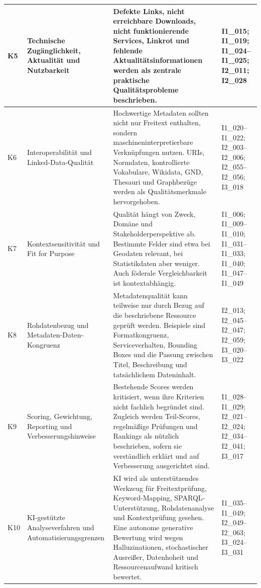 \begin{center}
\begin{longtable}{p{} p{} p{} p{}}
K5 & Technische Zugänglichkeit, Aktualität und Nutzbarkeit
& Defekte Links, nicht erreichbare Downloads, nicht funktionierende Services, Linkrot und fehlende Aktualitätsinformationen werden als zentrale praktische Qualitätsprobleme beschrieben.
& I1\_015; I1\_019; I1\_024--I1\_025; I2\_011; I2\_028 \\ \hline

K6 & Interoperabilität und Linked-Data-Qualität
& Hochwertige Metadaten sollten nicht nur Freitext enthalten, sondern maschineninterpretierbare Verknüpfungen nutzen. URIs, Normdaten, kontrollierte Vokabulare, Wikidata, \acrfull{GND}, Thesauri und Graphbezüge werden als Qualitätsmerkmale hervorgehoben.
& I1\_020--I1\_022; I2\_003--I2\_006; I2\_055--I2\_056; I3\_018 \\ \hline

K7 & Kontextsensitivität und Fit for Purpose
& Qualität hängt von Zweck, Domäne und Stakeholderperspektive ab. Bestimmte Felder sind etwa bei Geodaten relevant, bei Statistikdaten aber weniger. Auch föderale Vergleichbarkeit ist kontextabhängig.
& I1\_006; I1\_009--I1\_010; I1\_031--I1\_033; I1\_040; I1\_047--I1\_049 \\ \hline

K8 & Rohdatenbezug und Metadaten-Daten-Kongruenz
& Metadatenqualität kann teilweise nur durch Bezug auf die beschriebene Ressource geprüft werden. Beispiele sind Formatkongruenz, Serviceverhalten, Bounding Boxes und die Passung zwischen Titel, Beschreibung und tatsächlichem Dateninhalt.
& I2\_013; I2\_045--I2\_047; I2\_059; I3\_020--I3\_022 \\ \hline

K9 & Scoring, Gewichtung, Reporting und Verbesserungshinweise
& Bestehende Scores werden kritisiert, wenn ihre Kriterien nicht fachlich begründet sind. Zugleich werden Teil-Scores, regelmäßige Prüfungen und Rankings als nützlich beschrieben, sofern sie verständlich erklärt und auf Verbesserung ausgerichtet sind.
& I1\_028--I1\_029; I2\_021--I2\_024; I2\_034--I2\_041; I3\_017 \\ \hline

K10 & KI-gestützte Analyseverfahren und Automatisierungsgrenzen
& KI wird als unterstützendes Werkzeug für Freitextprüfung, Keyword-Mapping, SPARQL-Unterstützung, Rohdatenanalyse und Kontextprüfung gesehen. Eine autonome generative Bewertung wird wegen Halluzinationen, stochastischer Ausreißer, Datenhoheit und Ressourcenaufwand kritisch bewertet.
& I1\_035--I1\_049; I2\_049--I2\_063; I3\_024--I3\_031 \\

\end{longtable}
\end{center}
\normalsize

